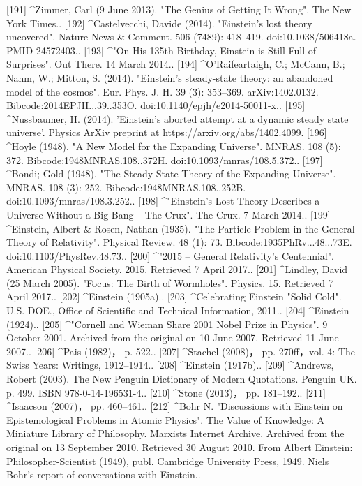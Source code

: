 [191]
^Zimmer, Carl (9 June 2013). "The Genius of Getting It Wrong". The New York Times..
[192]
^Castelvecchi, Davide (2014). "Einstein's lost theory uncovered". Nature News & Comment. 506 (7489): 418–419. doi:10.1038/506418a. PMID 24572403..
[193]
^"On His 135th Birthday, Einstein is Still Full of Surprises". Out There. 14 March 2014..
[194]
^O'Raifeartaigh, C.; McCann, B.; Nahm, W.; Mitton, S. (2014). "Einstein's steady-state theory: an abandoned model of the cosmos". Eur. Phys. J. H. 39 (3): 353–369. arXiv:1402.0132. Bibcode:2014EPJH...39..353O. doi:10.1140/epjh/e2014-50011-x..
[195]
^Nussbaumer, H. (2014). 'Einstein’s aborted attempt at a dynamic steady state universe’. Physics ArXiv preprint at https://arxiv.org/abs/1402.4099.
[196]
^Hoyle (1948). "A New Model for the Expanding Universe". MNRAS. 108 (5): 372. Bibcode:1948MNRAS.108..372H. doi:10.1093/mnras/108.5.372..
[197]
^Bondi; Gold (1948). "The Steady-State Theory of the Expanding Universe". MNRAS. 108 (3): 252. Bibcode:1948MNRAS.108..252B. doi:10.1093/mnras/108.3.252..
[198]
^"Einstein's Lost Theory Describes a Universe Without a Big Bang – The Crux". The Crux. 7 March 2014..
[199]
^Einstein, Albert & Rosen, Nathan (1935). "The Particle Problem in the General Theory of Relativity". Physical Review. 48 (1): 73. Bibcode:1935PhRv...48...73E. doi:10.1103/PhysRev.48.73..
[200]
^"2015 – General Relativity's Centennial". American Physical Society. 2015. Retrieved 7 April 2017..
[201]
^Lindley, David (25 March 2005). "Focus: The Birth of Wormholes". Physics. 15. Retrieved 7 April 2017..
[202]
^Einstein (1905a)..
[203]
^Celebrating Einstein "Solid Cold". U.S. DOE., Office of Scientific and Technical Information, 2011..
[204]
^Einstein (1924)..
[205]
^"Cornell and Wieman Share 2001 Nobel Prize in Physics". 9 October 2001. Archived from the original on 10 June 2007. Retrieved 11 June 2007..
[206]
^Pais (1982)， p. 522..
[207]
^Stachel (2008)， pp. 270ff，vol. 4: The Swiss Years: Writings, 1912–1914..
[208]
^Einstein (1917b)..
[209]
^Andrews, Robert (2003). The New Penguin Dictionary of Modern Quotations. Penguin UK. p. 499. ISBN 978-0-14-196531-4..
[210]
^Stone (2013)， pp. 181–192..
[211]
^Isaacson (2007)， pp. 460–461..
[212]
^Bohr N. "Discussions with Einstein on Epistemological Problems in Atomic Physics". The Value of Knowledge: A Miniature Library of Philosophy. Marxists Internet Archive. Archived from the original on 13 September 2010. Retrieved 30 August 2010. From Albert Einstein: Philosopher-Scientist (1949), publ. Cambridge University Press, 1949. Niels Bohr's report of conversations with Einstein..
